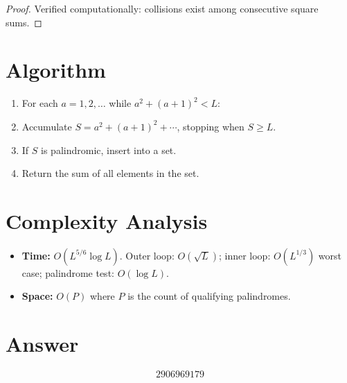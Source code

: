 \documentclass[11pt,a4paper]{article}
\begin{document}
\begin{proof}
Verified computationally: collisions exist among consecutive square sums.
\end{proof}

\section{Algorithm}

\begin{enumerate}
\item For each $a = 1, 2, \ldots$ while $a^2 + (a+1)^2 < L$:
\item \quad Accumulate $S = a^2 + (a+1)^2 + \cdots$, stopping when $S \ge L$.
\item \quad If $S$ is palindromic, insert into a set.
\item Return the sum of all elements in the set.
\end{enumerate}

\section{Complexity Analysis}

\begin{itemize}
\item \textbf{Time:} $O(L^{5/6} \log L)$. Outer loop: $O(\sqrt{L})$; inner loop: $O(L^{1/3})$ worst case; palindrome test: $O(\log L)$.
\item \textbf{Space:} $O(P)$ where $P$ is the count of qualifying palindromes.
\end{itemize}

\section{Answer}

\[
\boxed{2906969179}
\]
\end{document}

